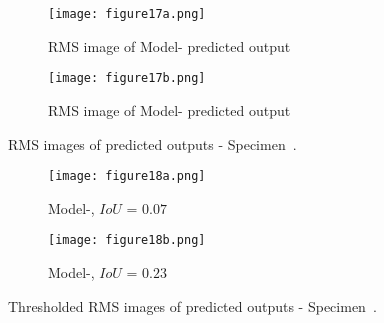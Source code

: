 \begin{figure} [!h]
	\begin{subfigure}[b]{.49\textwidth}
		\centering
		\texttt{[image: figure17a.png]}
		\caption{RMS image of Model- predicted output}
		\label{fig:RMS_L3_S4_B_saeed}
	\end{subfigure}
	\hfill
	\begin{subfigure}[b]{.49\textwidth}
		\centering
		\texttt{[image: figure17b.png]}
		\caption{RMS image of Model- predicted output} 
		\label{fig:RMS_L3_S4_B_ijjeh}
	\end{subfigure}
	\caption{RMS images of predicted outputs - Specimen~.}
	\label{fig:RMS_L3_S4_B__images}
\end{figure} 
\begin{figure} [!h]
	\begin{subfigure}[b]{.49\textwidth}
		\centering
		\texttt{[image: figure18a.png]}
		\caption{Model-, \(IoU\) = \(0.07\)}
		\label{fig:RMS_threshold_L3_S4_B_saeed}
	\end{subfigure}
	\hfill
	\begin{subfigure}[b]{.49\textwidth}
		\centering
		\texttt{[image: figure18b.png]}
		\caption{Model-, \(IoU\) = \(0.23\)} 
		\label{fig:RMS_threshold_L3_S4_B_ijjeh}
	\end{subfigure}
	\caption{Thresholded RMS images of predicted outputs - Specimen~.}
	\label{fig:RMS_threshold_L3_S4_B__images}
\end{figure} 

